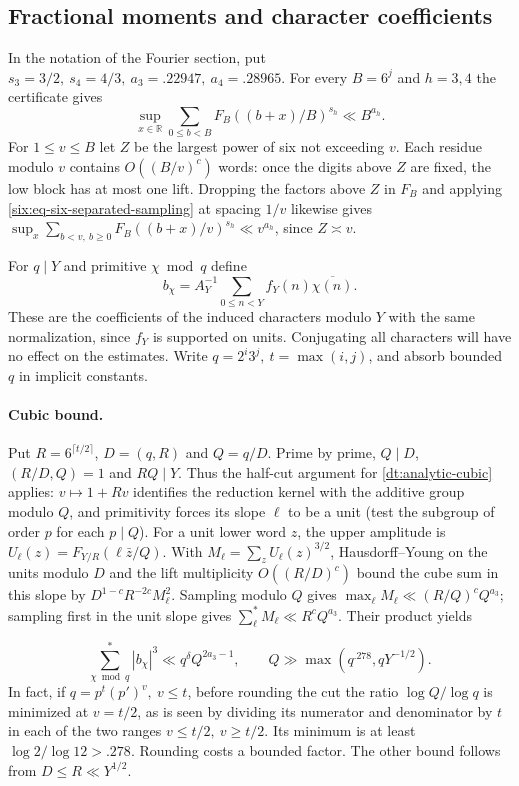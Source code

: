 \documentclass[11pt,a4paper]{article}
\theoremstyle{paperplain}
\numberwithin{equation}{section}
\begin{document}
\subsection{Fractional moments and character coefficients}
In the notation of the Fourier section, put
\(s_3=3/2,\ s_4=4/3,\ a_3=.22947,\ a_4=.28965\).
For every \(B=6^j\) and \(h=3,4\) the certificate gives
\begin{equation}\label{six:eq-six-low-sampling}
 \sup_{x\in\mathbb R}\sum_{0\le b<B}F_B((b+x)/B)^{s_h}
 \ll B^{a_h}.
\end{equation}
For $1\le v\le B$ let $Z$ be the largest power of six not exceeding
$v$. Each residue modulo $v$ contains $O((B/v)^c)$ words: once the
digits above $Z$ are fixed, the low block has at most one lift.
Dropping the factors above $Z$ in $F_B$ and applying
\eqref{six:eq-six-separated-sampling} at spacing $1/v$ likewise gives
$\sup_x\sum_{b<v,\ b\ge0} F_B((b+x)/v)^{s_h}\ll v^{a_h}$, since $Z\asymp v$.

For \(q\mid Y\) and primitive \(\chi\bmod q\) define
\[
 b_\chi=A_Y^{-1}\sum_{0\le n<Y}f_Y(n)\overline{\chi(n)} .
\]
These are the coefficients of the induced characters modulo \(Y\)
with the same normalization, since \(f_Y\) is supported on units.
Conjugating all characters will have no effect on the estimates.
Write \(q=2^i3^j,\ t=\max(i,j)\), and absorb bounded \(q\) in
implicit constants.

\paragraph{Cubic bound.}
Put $R=6^{\lceil t/2\rceil}$, $D=(q,R)$ and $Q=q/D$.
Prime by prime, $Q\mid D$, $(R/D,Q)=1$ and $RQ\mid Y$.
Thus the half-cut argument for \eqref{dt:analytic-cubic} applies:
$v\mapsto1+Rv$ identifies the reduction kernel with the additive
group modulo $Q$, and primitivity forces its slope $\ell$ to be a
unit (test the subgroup of order $p$ for each $p\mid Q$).
For a unit lower word $z$, the upper amplitude is
$U_\ell(z)=F_{Y/R}(\ell\bar z/Q)$. With $M_\ell=\sum_z U_\ell(z)^{3/2}$,
Hausdorff--Young on the units modulo $D$ and the lift multiplicity
$O((R/D)^c)$ bound the cube sum in this slope by
$D^{1-c}R^{-2c}M_\ell^2$. Sampling modulo $Q$ gives
$\max_\ell M_\ell\ll(R/Q)^c Q^{a_3}$; sampling first in the unit
slope gives $\sum_\ell^*M_\ell\ll R^c Q^{a_3}$. Their product yields

\begin{equation}\label{six:eq-six-low-cube}
 \sum_{\chi\bmod q}^{*}|b_\chi|^3\ll q^\delta Q^{2a_3-1},
 \qquad Q\gg\max(q^{.278},qY^{-1/2}).
\end{equation}
In fact, if \(q=p^t(p')^v,\ v\le t\), before rounding the cut the
ratio \(\log Q/\log q\) is minimized at \(v=t/2\), as is seen by
dividing its numerator and denominator by \(t\) in each of the two
ranges \(v\le t/2,\ v\ge t/2\). Its minimum is at least
\(\log2/\log12>.278\). Rounding costs a bounded factor.
The other bound follows from \(D\le R\ll Y^{1/2}\).
\end{document}
